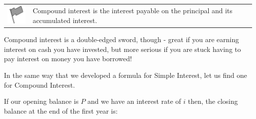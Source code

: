 \label{m39334*fhsst!!!underscore!!!id2023}\begin{definition}
	  \begin{tabular*}{15 cm}{m{15 mm}m{}}
	\hspace*{-50pt}  \includegraphics[width=0.5in]{col11306.imgs/psflag2.png}   & \Definition{   \label{id2481335}\textbf{ Compound Interest }} { \label{m39334*meaningfhsst!!!underscore!!!id2023}
      \label{m39334*id72635}Compound interest is the interest payable on the principal and its accumulated interest. \par 
       } 
      \end{tabular*}
      \end{definition}
      \label{m39334*id72647}Compound interest is a double-edged sword, though - great if you are earning interest on cash you have invested, but more serious if you are stuck having to pay interest on money you have borrowed!\par 
      \label{m39334*id72652}In the same way that we developed a formula for Simple Interest, let us find one for Compound Interest.\par 
      \label{m39334*id72656}If our opening balance is $P$ and we have an interest rate of \begin{math}i\end{math} then, the closing balance at the end of the first year is:\par 
      \label{m39334*id72678}\nopagebreak\noindent{}
